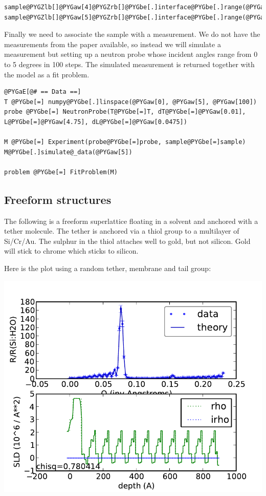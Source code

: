 \documentclass[letterpaper,10pt,english]{sphinxmanual}
\begin{document}
\begin{Verbatim}[commandchars=@\[\]]
sample@PYGZlb[]@PYGaw[4]@PYGZrb[]@PYGbe[.]interface@PYGbe[.]range(@PYGaw[5],@PYGaw[45])
sample@PYGZlb[]@PYGaw[5]@PYGZrb[]@PYGbe[.]interface@PYGbe[.]range(@PYGaw[5],@PYGaw[45])
\end{Verbatim}

Finally we need to associate the sample with a measurement.  We do not
have the measurements from the paper available, so instead we will
simulate a measurement but setting up a neutron probe whose incident
angles range from 0 to 5 degrees in 100 steps.  The simulated measurement
is returned together with the model as a fit problem.

\begin{Verbatim}[commandchars=@\[\]]
@PYGaE[@# == Data ==]
T @PYGbe[=] numpy@PYGbe[.]linspace(@PYGaw[0], @PYGaw[5], @PYGaw[100])
probe @PYGbe[=] NeutronProbe(T@PYGbe[=]T, dT@PYGbe[=]@PYGaw[0.01], L@PYGbe[=]@PYGaw[4.75], dL@PYGbe[=]@PYGaw[0.0475])

M @PYGbe[=] Experiment(probe@PYGbe[=]probe, sample@PYGbe[=]sample)
M@PYGbe[.]simulate@_data(@PYGaw[5])

problem @PYGbe[=] FitProblem(M)
\end{Verbatim}


\subsection{Freeform structures}
\label{examples/superlattice/freeform:freeform-structures}\label{examples/superlattice/freeform::doc}
The following is a freeform superlattice floating in a solvent
and anchored with a tether molecule.  The tether is anchored via
a thiol group to a multilayer of Si/Cr/Au.  The sulphur in the
thiol attaches well to gold, but not silicon.  Gold will stick
to chrome which sticks to silicon.

Here is the plot using a random tether, membrane and tail group:

\includegraphics{1f37e03481.pdf}
\end{document}
